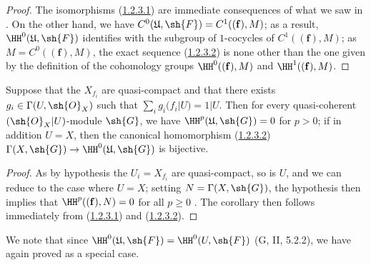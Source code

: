 \begin{proof}
The isomorphisms (\hyperref[III.1.2.3.1]{1.2.3.1}) are immediate consequences of what we saw in .
On the other hand, we have $C^0(\mathfrak{U},\sh{F})=C^1((\mathbf{f}),M)$; as a result, $\HH^0(\mathfrak{U},\sh{F})$ identifies with the subgroup of $1$-cocycles of $C^1((\mathbf{f}),M)$; as $M=C^0((\mathbf{f}),M)$, the exact sequence (\hyperref[III.1.2.3.2]{1.2.3.2}) is none other than the one given by the definition of the cohomology groups $\HH^0((\mathbf{f}),M)$ and $\HH^1((\mathbf{f}),M)$.
\end{proof}

\begin{corollary}[1.2.4]
\label{III.1.2.4}
Suppose that the $X_{f_i}$ are quasi-compact and that there exists $g_i\in\Gamma(U,\sh{O}_X)$ such that $\sum_i g_i(f_i|U)=1|U$.
Then for every quasi-coherent $(\sh{O}_X|U)$-module $\sh{G}$, we have $\HH^p(\mathfrak{U},\sh{G})=0$ for $p>0$; if in addition $U=X$, then the canonical homomorphism (\hyperref[III.1.2.3.2]{1.2.3.2}) $\Gamma(X,\sh{G})\to\HH^0(\mathfrak{U},\sh{G})$ is bijective.
\end{corollary}

\begin{proof}
As by hypothesis the $U_i=X_{f_i}$ are quasi-compact, so is $U$, and we can reduce to the case where $U=X$; setting $N=\Gamma(X,\sh{G})$, the hypothesis then implies that $\HH^p((\mathbf{f}),N)=0$ for all $p\geq 0$ .
The corollary then follows immediately from (\hyperref[III.1.2.3.1]{1.2.3.1}) and (\hyperref[III.1.2.3.2]{1.2.3.2}).
\end{proof}

We note that since $\HH^0(\mathfrak{U},\sh{F})=\HH^0(U,\sh{F})$ (G, II, 5.2.2), we have again proved  as a special case.

